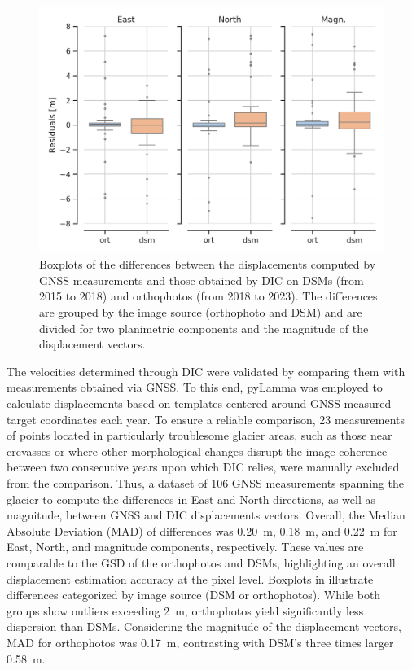\begin{figure}[ht!]
    \centering
    \includegraphics[width=0.8\columnwidth]{gps_lamma_boxplot.png}
    \caption{Boxplots of the differences between the displacements computed by GNSS measurements and those obtained by DIC on DSMs (from 2015 to 2018) and orthophotos (from 2018 to 2023). The differences are grouped by the image source (orthophoto and DSM) and are divided for two planimetric components and the magnitude of the displacement vectors.}
    \label{fig:3:gps_lamma_boxplot}
\end{figure}

The velocities determined through DIC were validated by comparing them with measurements obtained via GNSS.
To this end, pyLamma was employed to calculate displacements based on templates centered around GNSS-measured target coordinates each year. 
To ensure a reliable comparison, 23 measurements of points located in particularly troublesome glacier areas, such as those near crevasses or where other morphological changes disrupt the image coherence between two consecutive years upon which DIC relies, were manually excluded from the comparison.
Thus, a dataset of 106 GNSS measurements spanning the glacier to compute the differences in East and North directions, as well as magnitude, between GNSS and DIC displacements vectors.
Overall, the Median Absolute Deviation (MAD) of differences was \SI{0.20}{\meter}, \SI{0.18}{\meter}, and \SI{0.22}{\meter} for East, North, and magnitude components, respectively.
These values are comparable to the GSD of the orthophotos and DSMs, highlighting an overall displacement estimation accuracy at the pixel level.
Boxplots in  illustrate differences categorized by image source (DSM or orthophotos). 
While both groups show outliers exceeding \SI{2}{\meter}, orthophotos yield significantly less dispersion than DSMs.
Considering the magnitude of the displacement vectors, MAD for orthophotos was \SI{0.17}{\meter}, contrasting with DSM's three times larger \SI{0.58}{\meter}. 

